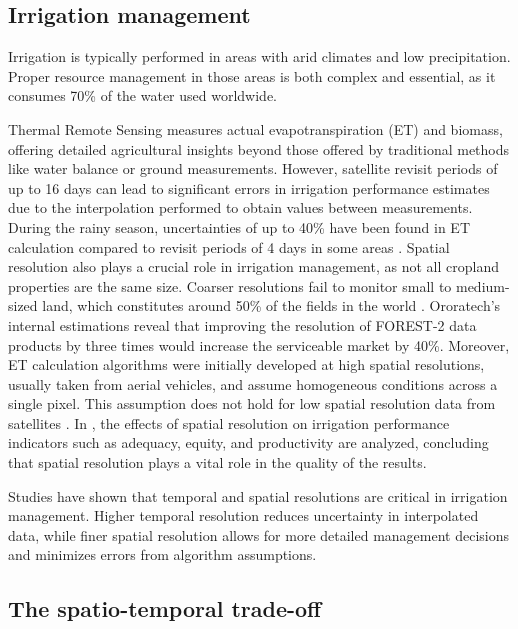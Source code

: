     \subsection{Irrigation management}

    Irrigation is typically performed in areas with arid climates and low precipitation. Proper resource management in those areas is both complex and essential, as it consumes 70\% of the water used worldwide.

    Thermal Remote Sensing measures actual evapotranspiration (ET) and biomass, offering detailed agricultural insights beyond those offered by traditional methods like water balance or ground measurements. However, satellite revisit periods of up to 16 days can lead to significant errors in irrigation performance estimates due to the interpolation performed to obtain values between measurements. During the rainy season, uncertainties of up to 40\% have been found in ET calculation compared to revisit periods of 4 days in some areas \cite{rs11050573}. 
    Spatial resolution also plays a crucial role in irrigation management, as not all cropland properties are the same size. Coarser resolutions fail to monitor small to medium-sized land, which constitutes around 50\% of the fields in the world \cite{Lesiv2018}. Ororatech's internal estimations reveal that improving the resolution of FOREST-2 data products by three times would increase the serviceable market by 40\%. 
    Moreover, ET calculation algorithms were initially developed at high spatial resolutions, usually taken from aerial vehicles, and assume homogeneous conditions across a single pixel. This assumption does not hold for low spatial resolution data from satellites \cite{rs13081524}.
    In \cite{rs12182949}, the effects of spatial resolution on irrigation performance indicators such as adequacy, equity, and productivity are analyzed, concluding that spatial resolution plays a vital role in the quality of the results. 
    
    Studies have shown that temporal and spatial resolutions are critical in irrigation management. Higher temporal resolution reduces uncertainty in interpolated data, while finer spatial resolution allows for more detailed management decisions and minimizes errors from algorithm assumptions.


    \subsection{The spatio-temporal trade-off}

